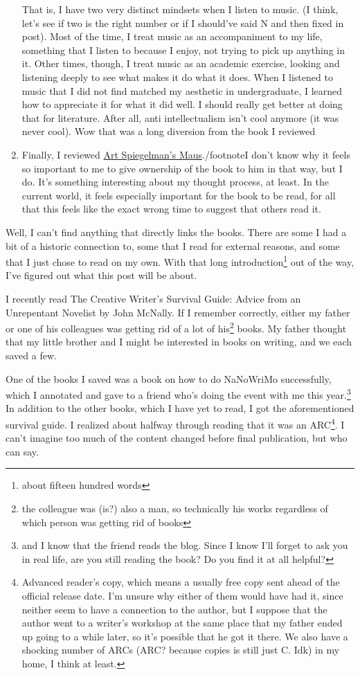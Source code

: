 \documentclass[12pt]{article}[titlepage]
\newcommand{\1}{\={a}}
\newcommand{\2}{\={e}}
\newcommand{\3}{\={\i}}
\newcommand{\4}{\=o}
\newcommand{\5}{\=u}
\newcommand{\6}{\={A}}
\renewcommand{\,}{\textsuperscript{,}}
\begin{document}
\begin{enumerate}
{That is, I have two very distinct mindsets when I listen to music. (I think, let's see if two is the right number or if I should've said N and then fixed in post).
Most of the time, I treat music as an accompaniment to my life, something that I listen to because I enjoy, not trying to pick up anything in it.
Other times, though, I treat music as an academic exercise, looking and listening deeply to see what makes it do what it does.
When I listened to music that I did not find matched my aesthetic in undergraduate, I learned how to appreciate it for what it did well.
I should really get better at doing that for literature.
After all, anti intellectualism isn't cool anymore (it was never cool).
Wow that was a long diversion from the book I reviewed}
\item Finally, I reviewed \href{book-review-maus.html}{Art Spiegelman's Maus}./footnote{I don't know why it feels so important to me to give ownership of the book to him in that way, but I do.
It's something interesting about my thought process, at least.}
In the current world, it feels especially important for the book to be read, for all that this feels like the exact wrong time to suggest that others read it.
\end{enumerate}


Well, I can't find anything that directly links the books.
There are some I had a bit of a historic connection to, some that I read for external reasons, and some that I just chose to read on my own.
With that long introduction\footnote{about fifteen hundred words} out of the way, I've figured out what this post will be about.

I recently read The Creative Writer's Survival Guide: Advice from an Unrepentant Novelist by John McNally.
If I remember correctly, either my father or one of his colleagues was getting rid of a lot of his\footnote{the colleague was (is?) also a man, so technically his works regardless of which person was getting rid of books} books.
My father thought that my little brother and I might be interested in books on writing, and we each saved a few.

One of the books I saved was a book on how to do NaNoWriMo successfully, which I annotated and gave to a friend who's doing the event with me this year.\footnote{and I know that the friend reads the blog. Since I know I'll forget to ask you in real life, are you still reading the book? Do you find it at all helpful?}
In addition to the other books, which I have yet to read, I got the aforementioned survival guide.
I realized about halfway through reading that it was an ARC\footnote{Advanced reader's copy, which means a usually free copy sent ahead of the official release date.
I'm unsure why either of them would have had it, since neither seem to have a connection to the author, but I suppose that the author went to a writer's workshop at the same place that my father ended up going to a while later, so it's possible that he got it there.
We also have a shocking number of ARCs (ARC? because copies is still just C. Idk) in my home, I think at least.}.
I can't imagine too much of the content changed before final publication, but who can say.
\end{document}
